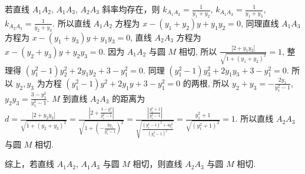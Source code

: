 \begin{question}[points=12]
\begin{solution}
若直线 $A_1A_2$, $A_1A_3$, $A_2A_3$ 斜率均存在，则 $k_{A_1A_2} = \frac{1}{y_1+y_2}$, $k_{A_1A_3} = \frac{1}{y_1+y_3}$, $k_{A_2A_3} = \frac{1}{y_2+y_3}$. 所以直线 $A_1A_2$ 方程为 $x - (y_1+y_2)y + y_1y_2 = 0$, 同理直线 $A_1A_3$ 方程为 $x - (y_1+y_3)y + y_1y_3 = 0$, 直线 $A_2A_3$ 方程为 $x - (y_2+y_3)y + y_2y_3 = 0$. 因为 $A_1A_2$ 与圆 $M$ 相切, 所以 $\frac{|2 + y_1y_2|}{\sqrt{1+(y_1+y_2)^2}} = 1$, 整理得 $(y_1^2-1)y_2^2 + 2y_1y_2 + 3 - y_1^2 = 0$. 同理 $(y_1^2-1)y_3^2 + 2y_1y_3 + 3 - y_1^2 = 0$. 所以 $y_2, y_3$ 为方程 $(y_1^2-1)y^2 + 2y_1y + 3 - y_1^2 = 0$ 的两根, 所以 $y_2+y_3 = -\frac{2y_1}{y_1^2-1}$, $y_2y_3 = \frac{3 - y_1^2}{y_1^2-1}$. $M$ 到直线 $A_2A_3$ 的距离为 $d = \frac{|2 + y_2y_3|}{\sqrt{1+(y_2+y_3)^2}} = \frac{|2 + \frac{3-y_1^2}{y_1^2-1}|}{\sqrt{1+\left(-\frac{2y_1}{y_1^2-1}\right)^2}} = \frac{|\frac{y_1^2+1}{y_1^2-1}|}{\sqrt{\frac{(y_1^2-1)^2+4y_1^2}{(y_1^2-1)^2}}} = \frac{y_1^2+1}{\sqrt{(y_1^2+1)^2}} = 1$. 所以直线 $A_2A_3$ 与圆 $M$ 相切.

综上，若直线 $A_1A_2$, $A_1A_3$ 与圆 $M$ 相切，则直线 $A_2A_3$ 与圆 $M$ 相切.
\end{solution}
\end{question}

